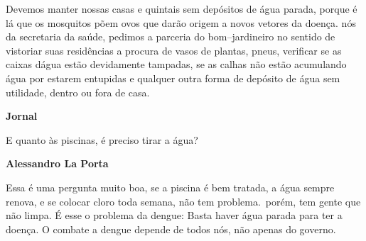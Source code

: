 \documentclass[12pt]{memoir}
\newenvironment{Entrevista}{%
  \par\bigskip\noindent\textbf{Jornal}\par}{%
  \par\smallskip\noindent\textbf{Alessandro La Porta}\par}
\begin{document}
Devemos manter nossas casas e quintais sem depósitos de água parada, porque é lá que os mosquitos põem ovos que darão origem a novos vetores da doença. nós da secretaria da saúde, pedimos a parceria do bom--jardineiro no sentido de vistoriar suas residências a procura de vasos de plantas, pneus, verificar se as caixas dágua estão devidamente tampadas, se as calhas não estão acumulando água por estarem entupidas e qualquer outra forma de depósito de água sem utilidade, dentro ou fora de casa.

\begin{Entrevista}
E quanto às piscinas, é preciso tirar a água?
\end{Entrevista}

Essa é uma pergunta muito boa, se a piscina é bem tratada, a água sempre renova, e se colocar cloro toda semana, não tem problema.\ porém, tem gente que não limpa. É esse o problema da dengue: Basta haver água parada para ter a doença. O combate a dengue depende de todos nós, não apenas do governo.
\end{document}
